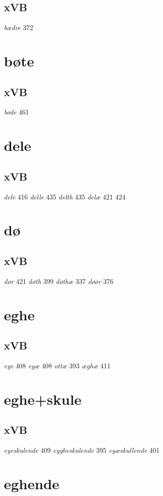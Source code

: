 \documentclass[a4paper,twocolumn]{article}
\begin{document}
\subsection{xVB}
\label{sec:org48cbef9}
\emph{bædre} 372 
\section{bøte}
\label{sec:orgc78b42a}
\subsection{xVB}
\label{sec:orge8dcf43}
\emph{bøde} 461 
\section{dele}
\label{sec:orga3edcf0}
\subsection{xVB}
\label{sec:org5bf6a3a}
\emph{dele} 416 \emph{delle} 435 \emph{delth} 435 \emph{delæ} 421 424 
\section{dø}
\label{sec:orgbdb1e7c}
\subsection{xVB}
\label{sec:org4073ab7}
\emph{dør} 421 \emph{døth} 399 \emph{døthæ} 337 \emph{døør} 376 
\section{eghe}
\label{sec:orgdaf940a}
\subsection{xVB}
\label{sec:org5218a71}
\emph{eye} 408 \emph{eyæ} 408 \emph{ottæ} 393 \emph{æghæ} 411 
\section{eghe+skule}
\label{sec:orga71f082}
\subsection{xVB}
\label{sec:org958b7c2}
\emph{eyeskulende} 409 \emph{eygheskulende} 395 \emph{eyæskullende} 401 
\section{eghende}
\label{sec:orgc4a7742}
\end{document}
